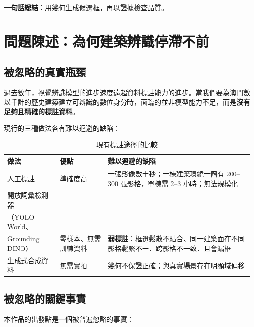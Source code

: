 \documentclass[11pt,a4paper,fontset=windows]{ctexart}
\newcommand{\warn}[1]{\textbf{\color{red2}#1}}
\begin{document}
\vspace{4pt}
{\small\color{ink}\textbf{一句話總結：}用幾何生成候選框，再以證據檢查品質。}

\newpage
\tableofcontents
\newpage

\section{問題陳述：為何建築辨識停滯不前}

\subsection{被忽略的真實瓶頸}

過去數年，視覺辨識模型的進步速度遠超資料標註能力的進步。當我們要為澳門數以千計的歷史建築建立可辨識的數位身分時，面臨的並非模型能力不足，而是\textbf{沒有足夠且精確的標註資料}。

現行的三種做法各有難以迴避的缺陷：

\begin{table}[H]
\centering
\small
\caption{現有標註途徑的比較}
\begin{tabular}{p{3.0cm}p{4.4cm}p{6.6cm}}
\toprule
\textbf{做法} & \textbf{優點} & \textbf{難以迴避的缺陷} \\
\midrule
人工標註 & 準確度高 & 一張影像數十秒；一棟建築環繞一圈有 200--300 張影格，單棟需 2--3 小時；無法規模化 \\
\addlinespace
開放詞彙檢測器\\（YOLO-World、\\Grounding DINO）& 零樣本、無需訓練資料 & \warn{弱標註}：框選鬆散不貼合、同一建築面在不同影格鬆緊不一、跨影格不一致、且會漏框 \\
\addlinespace
生成式合成資料 & 無需實拍 & 幾何不保證正確；與真實場景存在明顯域偏移 \\
\bottomrule
\end{tabular}
\end{table}

\subsection{被忽略的關鍵事實}

本作品的出發點是一個被普遍忽略的事實：

\begin{center}
\end{center}
\end{document}
